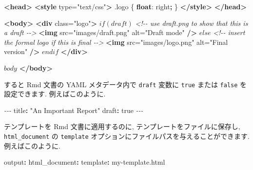 \documentclass[
  11pt,
]{bxjsreport}
\newenvironment{Shaded}{\begin{snugshade}}{\end{snugshade}}
\newcommand{\AttributeTok}[1]{\textcolor[rgb]{0.77,0.63,0.00}{#1}}
\newcommand{\CharTok}[1]{\textcolor[rgb]{0.31,0.60,0.02}{#1}}
\newcommand{\CommentTok}[1]{\textcolor[rgb]{0.56,0.35,0.01}{\textit{#1}}}
\newcommand{\DecValTok}[1]{\textcolor[rgb]{0.00,0.00,0.81}{#1}}
\newcommand{\FunctionTok}[1]{\textcolor[rgb]{0.00,0.00,0.00}{#1}}
\newcommand{\KeywordTok}[1]{\textcolor[rgb]{0.13,0.29,0.53}{\textbf{#1}}}
\newcommand{\NormalTok}[1]{#1}
\newcommand{\OperatorTok}[1]{\textcolor[rgb]{0.81,0.36,0.00}{\textbf{#1}}}
\newcommand{\OtherTok}[1]{\textcolor[rgb]{0.56,0.35,0.01}{#1}}
\newcommand{\PreprocessorTok}[1]{\textcolor[rgb]{0.56,0.35,0.01}{\textit{#1}}}
\newcommand{\StringTok}[1]{\textcolor[rgb]{0.31,0.60,0.02}{#1}}
\begin{document}
\begin{Shaded}
\begin{Highlighting}[]
\KeywordTok{\textless{}head\textgreater{}}
\KeywordTok{\textless{}style}\OtherTok{ type=}\StringTok{"text/css"}\KeywordTok{\textgreater{}}
\FunctionTok{.logo}\NormalTok{ \{}
  \KeywordTok{float}\NormalTok{: }\DecValTok{right}\OperatorTok{;}
\NormalTok{\}}
\KeywordTok{\textless{}/style\textgreater{}}
\KeywordTok{\textless{}/head\textgreater{}}

\KeywordTok{\textless{}body\textgreater{}}
\KeywordTok{\textless{}div}\OtherTok{ class=}\StringTok{"logo"}\KeywordTok{\textgreater{}}
\NormalTok{$if(draft)$}
\CommentTok{\textless{}!{-}{-} use draft.png to show that this is a draft {-}{-}\textgreater{}}
\KeywordTok{\textless{}img}\OtherTok{ src=}\StringTok{"images/draft.png"}\OtherTok{ alt=}\StringTok{"Draft mode"} \KeywordTok{/\textgreater{}}
\NormalTok{$else$}
\CommentTok{\textless{}!{-}{-} insert the formal logo if this is final {-}{-}\textgreater{}}
\KeywordTok{\textless{}img}\OtherTok{ src=}\StringTok{"images/logo.png"}\OtherTok{ alt=}\StringTok{"Final version"} \KeywordTok{/\textgreater{}}
\NormalTok{$endif$}
\KeywordTok{\textless{}/div\textgreater{}}

\NormalTok{$body$}
\KeywordTok{\textless{}/body\textgreater{}}
\end{Highlighting}
\end{Shaded}

すると Rmd 文書の YAML メタデータ内で \texttt{draft} 変数に \texttt{true} または \texttt{false} を設定できます. 例えばこのように.

\begin{Shaded}
\begin{Highlighting}[]
\PreprocessorTok{{-}{-}{-}}
\FunctionTok{title}\KeywordTok{:}\AttributeTok{ }\StringTok{"An Important Report"}
\FunctionTok{draft}\KeywordTok{:}\AttributeTok{ }\CharTok{true}
\PreprocessorTok{{-}{-}{-}}
\end{Highlighting}
\end{Shaded}

テンプレートを Rmd 文書に適用するのに, テンプレートをファイルに保存し, \texttt{html\_document} の \texttt{template} オプションにファイルパスを与えることができます. 例えばこのように.

\begin{Shaded}
\begin{Highlighting}[]
\FunctionTok{output}\KeywordTok{:}
\AttributeTok{  }\FunctionTok{html\_document}\KeywordTok{:}
\AttributeTok{    }\FunctionTok{template}\KeywordTok{:}\AttributeTok{ my{-}template.html}
\end{Highlighting}
\end{Shaded}
\end{document}
